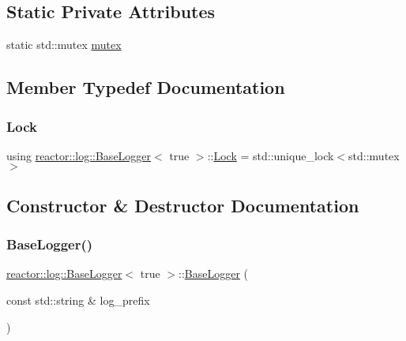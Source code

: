 \subsection*{Static Private Attributes}
\begin{DoxyCompactItemize}
\item 
static std\+::mutex \hyperlink{classreactor_1_1log_1_1BaseLogger_3_01true_01_4_a8991911bde1823d50152926e3241c186}{mutex}
\end{DoxyCompactItemize}


\subsection{Member Typedef Documentation}
\mbox{\label{classreactor_1_1log_1_1BaseLogger_3_01true_01_4_a145f94a8210bc4c9bbf54c3af61bd8ce}} 
\subsubsection{\texorpdfstring{Lock}{Lock}}
{\footnotesize\ttfamily using \hyperlink{classreactor_1_1log_1_1BaseLogger}{reactor\+::log\+::\+Base\+Logger}$<$ true $>$\+::\hyperlink{classreactor_1_1log_1_1BaseLogger_3_01true_01_4_a145f94a8210bc4c9bbf54c3af61bd8ce}{Lock} =  std\+::unique\+\_\+lock$<$std\+::mutex$>$\hspace{0.3cm}{\ttfamily [private]}}



\subsection{Constructor \& Destructor Documentation}
\mbox{\label{classreactor_1_1log_1_1BaseLogger_3_01true_01_4_af11fb9ca0a141bdb7d5c14f3931735f9}} 
\subsubsection{\texorpdfstring{Base\+Logger()}{BaseLogger()}}
{\footnotesize\ttfamily \hyperlink{classreactor_1_1log_1_1BaseLogger}{reactor\+::log\+::\+Base\+Logger}$<$ true $>$\+::\hyperlink{classreactor_1_1log_1_1BaseLogger}{Base\+Logger} (\begin{DoxyParamCaption}\item[{const std\+::string \&}]{log\+\_\+prefix }\end{DoxyParamCaption})\hspace{0.3cm}{\ttfamily [inline]}}

